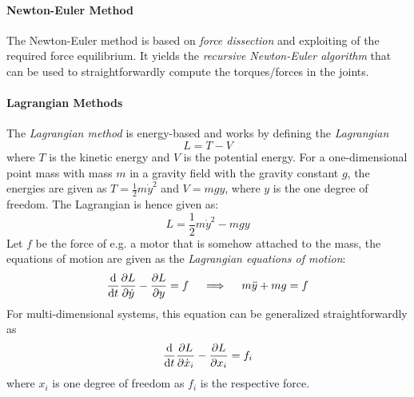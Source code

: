 				\paragraph{Newton-Euler Method}
					The Newton-Euler method is based on \emph{force dissection} and exploiting of the required force equilibrium. It yields the \emph{recursive Newton-Euler algorithm} that can be used to straightforwardly compute the torques/forces in the joints.

				\paragraph{Lagrangian Methods}
					The \emph{Lagrangian method} is energy-based and works by defining the \emph{Lagrangian}
					\begin{equation*}
						L = T - V
					\end{equation*}
					where \(T\) is the kinetic energy and \(V\) is the potential energy. For a one-dimensional point mass with mass \(m\) in a gravity field with the gravity constant \(g\), the energies are given as \( T = \frac{1}{2} m\dot{y}^2 \) and \( V = mgy \), where \(y\) is the one degree of freedom. The Lagrangian is hence given as:
					\begin{equation*}
						L = \frac{1}{2} m \dot{y}^2 - mgy
					\end{equation*}
					Let \(f\) be the force of e.g. a motor that is somehow attached to the mass, the equations of motion are given as the \emph{Lagrangian equations of motion}:
					\begin{equation*}
						\dv{t} \pdv{L}{\dot{y}} - \pdv{L}{y} = f
						\quad\implies\quad
						m \ddot{y} + mg = f
					\end{equation*}
					For multi-dimensional systems, this equation can be generalized straightforwardly as
					\begin{equation*}
						\dv{t} \pdv{L}{\dot{x}_i} - \pdv{L}{x_i} = f_i
					\end{equation*}
					where \(x_i\) is one degree of freedom as \(f_i\) is the respective force.

